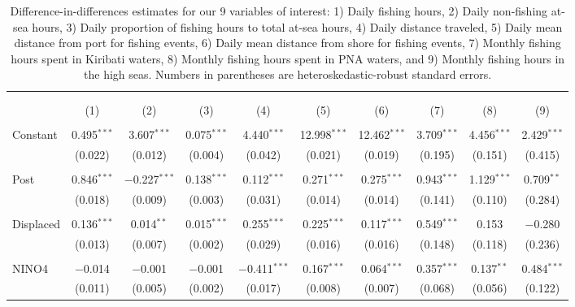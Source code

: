 \documentclass[12pt]{article}
\begin{document}
\begin{landscape}
\begin{table}[H] \centering 
  \caption{\label{tab:main_DID}Difference-in-differences estimates for our 9 variables of interest: 1) Daily fishing hours, 2) Daily non-fishing at-sea hours, 3) Daily proportion of fishing hours to total at-sea hours, 4) Daily distance traveled, 5) Daily mean distance from port for fishing events, 6) Daily mean distance from shore for fishing events, 7) Monthly fishing hours spent in Kiribati waters, 8) Monthly fishing hours spent in PNA waters, and 9) Monthly fishing hours in the high seas. Numbers in parentheses are heteroskedastic-robust standard errors.} 
  \label{} 
\footnotesize 
\begin{tabular}{@{\extracolsep{1pt}}lccccccccc} 
\\[-1.8ex]\hline 
\hline \\[-1.8ex] 
\\[-1.8ex] & (1) & (2) & (3) & (4) & (5) & (6) & (7) & (8) & (9)\\ 
\hline \\[-1.8ex] 
 Constant & 0.495$^{***}$ & 3.607$^{***}$ & 0.075$^{***}$ & 4.440$^{***}$ & 12.998$^{***}$ & 12.462$^{***}$ & 3.709$^{***}$ & 4.456$^{***}$ & 2.429$^{***}$ \\ 
  & (0.022) & (0.012) & (0.004) & (0.042) & (0.021) & (0.019) & (0.195) & (0.151) & (0.415) \\ 
  & & & & & & & & & \\ 
 Post & 0.846$^{***}$ & $-$0.227$^{***}$ & 0.138$^{***}$ & 0.112$^{***}$ & 0.271$^{***}$ & 0.275$^{***}$ & 0.943$^{***}$ & 1.129$^{***}$ & 0.709$^{**}$ \\ 
  & (0.018) & (0.009) & (0.003) & (0.031) & (0.014) & (0.014) & (0.141) & (0.110) & (0.284) \\ 
  & & & & & & & & & \\ 
 Displaced & 0.136$^{***}$ & 0.014$^{**}$ & 0.015$^{***}$ & 0.255$^{***}$ & 0.225$^{***}$ & 0.117$^{***}$ & 0.549$^{***}$ & 0.153 & $-$0.280 \\ 
  & (0.013) & (0.007) & (0.002) & (0.029) & (0.016) & (0.016) & (0.148) & (0.118) & (0.236) \\ 
  & & & & & & & & & \\ 
 NINO4 & $-$0.014 & $-$0.001 & $-$0.001 & $-$0.411$^{***}$ & 0.167$^{***}$ & 0.064$^{***}$ & 0.357$^{***}$ & 0.137$^{**}$ & 0.484$^{***}$ \\ 
  & (0.011) & (0.005) & (0.002) & (0.017) & (0.008) & (0.007) & (0.068) & (0.056) & (0.122) \\ 

\end{tabular}
\end{table}
\end{landscape}
\end{document}
